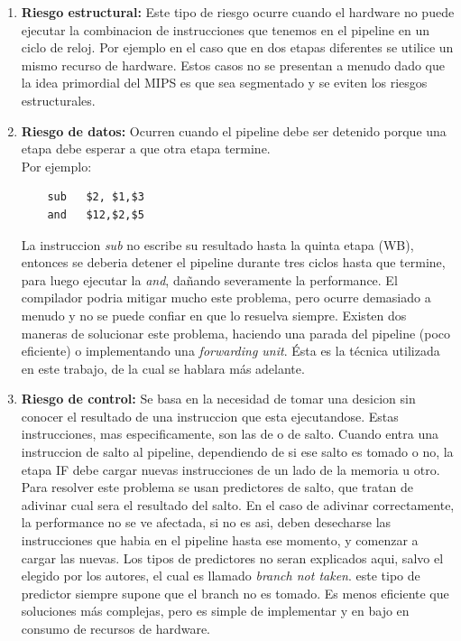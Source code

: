 \documentclass[12pt]{article}
\begin{document}
\begin{enumerate}
    \item \textbf{Riesgo estructural:} Este tipo de riesgo ocurre cuando el hardware no puede ejecutar la combinacion de instrucciones que tenemos en el pipeline en un ciclo de reloj. Por ejemplo en el caso que en dos etapas diferentes se utilice un mismo recurso de hardware. Estos casos no se presentan a menudo dado que la idea primordial del MIPS es que sea segmentado y se eviten los riesgos estructurales.
    \item \textbf{Riesgo de datos:} Ocurren cuando el pipeline debe ser detenido porque una etapa debe esperar a que otra etapa termine. \\

    Por ejemplo:
    \begin{lstlisting}
    sub   $2, $1,$3
    and   $12,$2,$5
    \end{lstlisting}

    La instruccion \textit{sub} no escribe su resultado hasta la quinta etapa (WB), entonces se deberia detener el pipeline durante tres ciclos hasta que termine, para luego ejecutar la \textit{and}, dañando severamente la performance. El compilador podria mitigar mucho este problema, pero ocurre demasiado a menudo y no se puede confiar en que lo resuelva siempre. Existen dos maneras de solucionar este problema, haciendo una parada del pipeline (poco eficiente) o implementando una \textit{forwarding unit}. Ésta es la técnica utilizada en este trabajo, de la cual se hablara más adelante.
    \item \textbf{Riesgo de control:} Se basa en la necesidad de tomar una desicion sin conocer el resultado de una instruccion que esta ejecutandose. Estas instrucciones, mas especificamente, son las de  o de salto. Cuando entra una instruccion de salto al pipeline, dependiendo de si ese salto es tomado o no, la etapa IF debe cargar nuevas instrucciones de un lado de la memoria u otro. Para resolver este problema se usan predictores de salto, que tratan de adivinar cual sera el resultado del salto. En el caso de adivinar correctamente, la performance no se ve afectada, si no es asi, deben desecharse las instrucciones que habia en el pipeline hasta ese momento, y comenzar a cargar las nuevas. Los tipos de predictores no seran explicados aqui, salvo el elegido por los autores, el cual es llamado \textit{branch not taken}. este tipo de predictor siempre supone que el branch no es tomado. Es menos eficiente que soluciones más complejas, pero es simple de implementar y en bajo en consumo de recursos de hardware.
\end{enumerate}
\end{document}
